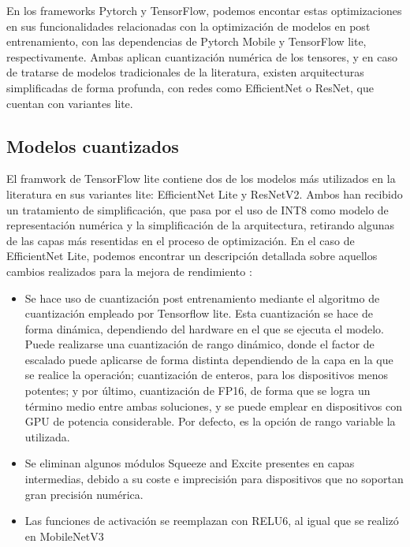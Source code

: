 En los frameworks Pytorch y TensorFlow, podemos encontar estas optimizaciones en sus funcionalidades relacionadas con la optimización de modelos en post entrenamiento, con las dependencias de Pytorch Mobile y TensorFlow lite, respectivamente. Ambas aplican cuantización numérica de los tensores, y en caso de tratarse de modelos tradicionales de la literatura, existen arquitecturas simplificadas de forma profunda, con redes como EfficientNet o ResNet, que cuentan con variantes lite.

\subsection{Modelos cuantizados}

El framwork de TensorFlow lite contiene dos de los modelos más utilizados en la literatura en sus variantes lite: EfficientNet Lite y ResNetV2. Ambos han recibido un tratamiento de simplificación, que pasa por el uso de INT8 como modelo de representación numérica y la simplificación de la arquitectura, retirando algunas de las capas más resentidas en el proceso de optimización. En el caso de EfficientNet Lite, podemos encontrar un descripción detallada sobre aquellos cambios realizados para la mejora de rendimiento \cite{eflite2}:

\begin{itemize}
	\item Se hace uso de cuantización post entrenamiento mediante el algoritmo de cuantización empleado por Tensorflow lite. Esta cuantización se hace de forma dinámica, dependiendo del hardware en el que se ejecuta el modelo. Puede realizarse una cuantización de rango dinámico, donde el factor de escalado puede aplicarse de forma distinta dependiendo de la capa en la que se realice la operación; cuantización de enteros, para los dispositivos menos potentes; y 	por último, cuantización de FP16, de forma que se logra un término medio entre ambas soluciones, y se puede emplear en dispositivos con GPU de potencia considerable. Por defecto, es la opción de rango variable la utilizada.
	\item Se eliminan algunos módulos Squeeze and Excite presentes en capas intermedias, debido a su coste e imprecisión para dispositivos que no soportan gran precisión numérica.
	\item Las funciones de activación se reemplazan con RELU6, al igual que se realizó en MobileNetV3 \cite {howard2019searching} 
\end{itemize}

